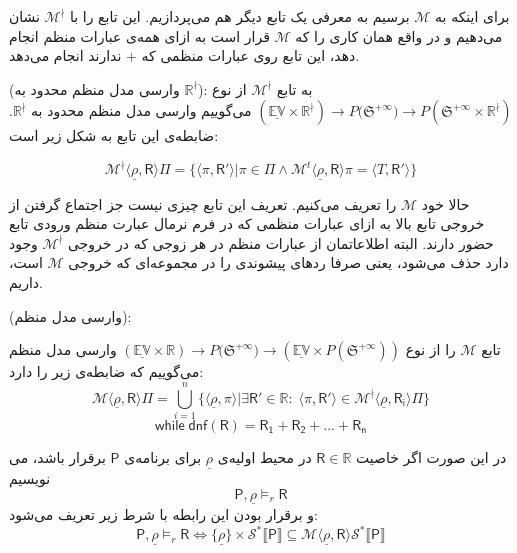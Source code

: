 برای اینکه به $\mathcal{M}$ برسیم به معرفی یک تابع دیگر هم می‌پردازیم. این تابع را با
 $\mathcal{M}^\nmid$ 
نشان می‌دهیم و در واقع همان کاری را که $\mathcal{M}$ قرار است به ازای همه‌ی عبارات منظم انجام دهد، این تابع روی عبارات منظمی که $+$ ندارند انجام می‌دهد.
\begin{defn}
	(وارسی مدل منظم محدود به $\mathbb{R^\nmid}$): به تابع $\mathcal{M}^\nmid$ از نوع \break
	$\mathbb{(\underline{EV} \times R^\nmid)} \rightarrow  \mathit{P}({\mathfrak{S}^{+\infty})}
	\rightarrow \mathit{P}(\mathfrak{S}^{+\infty} \times \mathbb{R}^\nmid ) $
	می‌گوییم وارسی مدل منظم محدود به $\mathbb{R^\nmid}$. ضابطه‌ی این تابع به شکل زیر است:
	
	 $$\mathcal{M}^\nmid \langle \underline{\rho} , \mathsf{R} \rangle \Pi= \{ \langle \pi , \mathsf{R'} \rangle | \pi \in \Pi \land  
	  \mathcal{M}^t \langle \underline{\rho} , \mathsf{R} \rangle \pi =
	 \langle \mathit{T} , \mathsf{R'} \rangle \}$$
\end{defn}


حالا خود $\mathcal{M}$ را تعریف می‌کنیم. تعریف این تابع چیزی نیست جز اجتماع گرفتن از خروجی تابع بالا به ازای عبارات منظمی که در فرم نرمال عبارت منظم ورودی تابع حضور دارند. البته اطلاعاتمان از عبارات منظم در هر زوجی که در خروجی $\mathcal{M}^\nmid$ وجود دارد حذف می‌شود، یعنی صرفا ردهای پیشوندی را در مجموعه‌ای که خروجی $\mathcal{M}$ است، داریم.

\begin{defn}
(وارسی مدل منظم):

تابع $\mathcal{M}$ را از نوع 
$\mathbb{(\underline{EV} \times R)} \rightarrow  \mathit{P}({\mathfrak{S}^{+\infty})}
\rightarrow (\mathbb{\underline{EV}} \times \mathit{P} (\mathfrak{S}^{+\infty} ) )$
 وارسی مدل منظم می‌گوییم که ضابطه‌ی زیر را دارد:
$$\mathcal{M} \langle \underline{\rho} , \mathsf{R} \rangle \Pi= \bigcup_{i=1}^n \{  \langle \underline{\rho},\pi\rangle | \exists \mathsf{R'} \in \mathbb{R}:\; \langle \pi , \mathsf{R'} \rangle \in 
\mathcal{M}^\nmid \langle \underline{\rho}, \mathsf{R_i} \rangle \Pi \}$$
$$\mathsf{while \; dnf (R) = R_1 + R_2 + ... + R_n}$$ 



در این صورت اگر خاصیت $\mathsf{R} \in \mathbb{R}$ در محیط اولیه‌ی $\underline{\rho}$ برای برنامه‌ی $\mathsf{P}$ برقرار باشد، می نویسیم
$$\mathsf{P} , \underline{\rho} \models_r \mathsf{R}$$
و برقرار بودن این رابطه با شرط زیر تعریف می‌شود:
$$\mathsf{P} , \underline{\rho} \models_r \mathsf{R} \iff \{\underline{\rho}\} \times \mathcal{S}^* \llbracket \mathsf{P} \rrbracket \subseteq \mathcal{M} \langle \underline{\rho} , \mathsf{R} \rangle \mathcal{S}^* \llbracket \mathsf{P} \rrbracket$$

\end{defn}

